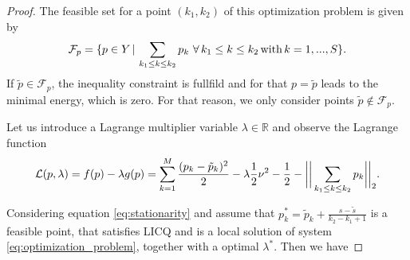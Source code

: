 \begin{proof}

        The feasible set for a point $(k_{1}, k_{2})$ of this optimization problem is given by
            $$
                \mathcal{F}_{p} = \{ p \in Y \, | \, \sum_{k_{1} \le k \le k_{2}} p_{k} \,\, \forall \, k_{1} \le k \le k_{2} \, \textnormal{with} \, k = 1, ..., S \}.
            $$
        If $\tilde{p} \in \mathcal{F}_{p}$, the inequality constraint is fullfild and for that $p = \tilde{p}$ leads to the minimal energy, which is zero. For that reason, we only consider points $\tilde{p} \notin \mathcal{F}_{p}$.

        Let us introduce a Lagrange multiplier variable $\lambda \in \mathbb{R}$ and observe the Lagrange function
        \begin{equation}
            \mathcal{L}(p, \lambda) = f(p) - \lambda g(p) = \sum_{k = 1}^{M} \frac{(p_{k} - \tilde{p}_{k})^{2}}{2} - \lambda \frac{1}{2} \nu^{2} - \frac{1}{2} - \bigg{|} \bigg{|} \sum_{k_{1} \le k \le k_{2}} p_{k} \bigg{|} \bigg{|}_{2}.
        \end{equation}

        Considering equation \ref{eq:stationarity} and assume that $p^{\ast}_{k} = \tilde{p}_{k} + \frac{s - \tilde{s}}{k_{2} - k_{1} + 1}$ is a feasible point, that satisfies LICQ and is a local solution of system \ref{eq:optimization_problem}, together with a optimal $\lambda^{\ast}$. Then we have


\end{proof}
